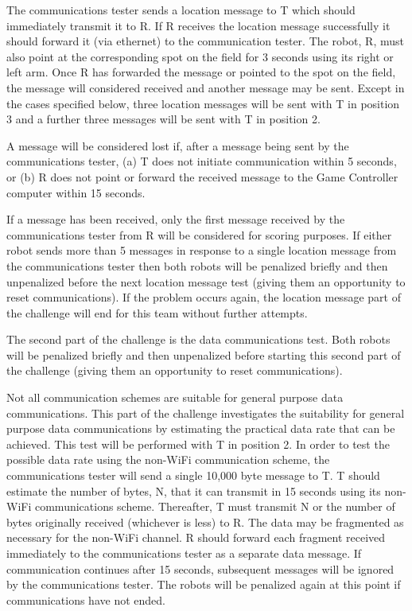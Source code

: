 \documentclass[12pt]{article}
\begin{document}
The communications tester sends a location message to T which should immediately transmit it to R.
If R receives the location message successfully it should forward it (via ethernet) to the communication tester. The robot, R, must also point at the corresponding spot on the field for 3 seconds using its right or left arm. Once R has forwarded the message or pointed to the spot on the field, the message will considered received and another message may be sent. Except in the cases specified below, three location messages will be sent with T in position 3 and a further three messages will be sent with T in position 2.

A message will be considered lost if, after a message being sent by the communications tester, (a) T does not initiate communication within 5 seconds, or (b) R does not point or forward the received message to the Game Controller computer within 15 seconds.

If a message has been received, only the first message received by the communications tester from R will be considered for scoring purposes. If either robot sends more than 5 messages in response to a single location message from the communications tester then both robots will be penalized briefly and then unpenalized before the next location message test (giving them an opportunity to reset communications). If the problem occurs again, the location message part of the challenge will end for this team without further attempts.

The second part of the challenge is the data communications test. Both robots will be penalized briefly and then unpenalized before starting this second part of the challenge (giving them an opportunity to reset communications).

Not all communication schemes are suitable for general purpose data communications. This part of the challenge investigates the suitability for general purpose data communications by estimating the practical data rate that can be achieved. This test will be performed with T in position 2.
In order to test the possible data rate using the non-WiFi communication scheme, the communications tester will send a single 10,000 byte message to T. T should estimate the number of bytes, N, that it can transmit in 15 seconds using its non-WiFi communications scheme. Thereafter, T must transmit N or the number of bytes originally received (whichever is less) to R. The data may be fragmented as necessary for the non-WiFi channel. R should forward each fragment received immediately to the communications tester as a separate data message. If communication continues after 15 seconds, subsequent messages will be ignored by the communications tester. The robots will be penalized again at this point if communications have not ended.
\end{document}
